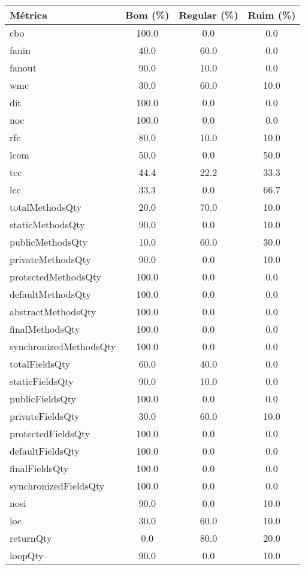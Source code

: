 \begin{tabular}{lccc}
                \toprule
                \textbf{Métrica} & \textbf{Bom (\%)} & \textbf{Regular (\%)} & \textbf{Ruim (\%)} \\
                \midrule
                cbo & 100.0 & 0.0 & 0.0 \\
fanin & 40.0 & 60.0 & 0.0 \\
fanout & 90.0 & 10.0 & 0.0 \\
wmc & 30.0 & 60.0 & 10.0 \\
dit & 100.0 & 0.0 & 0.0 \\
noc & 100.0 & 0.0 & 0.0 \\
rfc & 80.0 & 10.0 & 10.0 \\
lcom & 50.0 & 0.0 & 50.0 \\
tcc & 44.4 & 22.2 & 33.3 \\
lcc & 33.3 & 0.0 & 66.7 \\
totalMethodsQty & 20.0 & 70.0 & 10.0 \\
staticMethodsQty & 90.0 & 0.0 & 10.0 \\
publicMethodsQty & 10.0 & 60.0 & 30.0 \\
privateMethodsQty & 90.0 & 0.0 & 10.0 \\
protectedMethodsQty & 100.0 & 0.0 & 0.0 \\
defaultMethodsQty & 100.0 & 0.0 & 0.0 \\
abstractMethodsQty & 100.0 & 0.0 & 0.0 \\
finalMethodsQty & 100.0 & 0.0 & 0.0 \\
synchronizedMethodsQty & 100.0 & 0.0 & 0.0 \\
totalFieldsQty & 60.0 & 40.0 & 0.0 \\
staticFieldsQty & 90.0 & 10.0 & 0.0 \\
publicFieldsQty & 100.0 & 0.0 & 0.0 \\
privateFieldsQty & 30.0 & 60.0 & 10.0 \\
protectedFieldsQty & 100.0 & 0.0 & 0.0 \\
defaultFieldsQty & 100.0 & 0.0 & 0.0 \\
finalFieldsQty & 100.0 & 0.0 & 0.0 \\
synchronizedFieldsQty & 100.0 & 0.0 & 0.0 \\
nosi & 90.0 & 0.0 & 10.0 \\
loc & 30.0 & 60.0 & 10.0 \\
returnQty & 0.0 & 80.0 & 20.0 \\
loopQty & 90.0 & 0.0 & 10.0 \\

\end{tabular}
